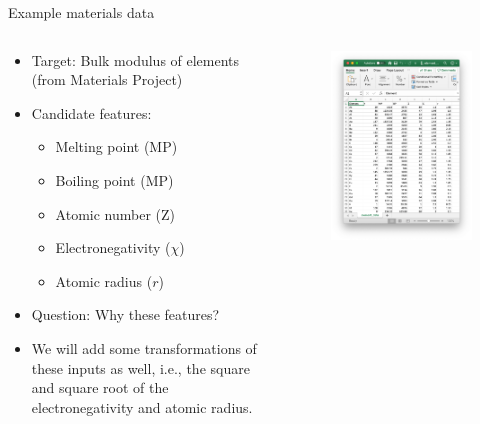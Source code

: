 \documentclass[aspectratio=169]{beamer}
\begin{document}
\begin{frame}{Example materials data}
    \begin{columns}
    \begin{column}{0.6\textwidth}
        \begin{itemize}
            \item Target: Bulk modulus of elements (from Materials Project)
            \item Candidate features:
            \begin{itemize}
                \item Melting point (MP)
                \item Boiling point (MP)
                \item Atomic number (Z)
                \item Electronegativity ($\chi$)
                \item Atomic radius ($r$)
            \end{itemize}
            \item Question: Why these features?
            \item We will add some transformations of these inputs as well, i.e., the square and square root of the electronegativity and atomic radius.
    \end{itemize}
    \end{column}
    \begin{column}{0.4\textwidth}
        \begin{figure}
        \centering
        \includegraphics[width=\textwidth]{figures/elementdata.png}

\end{figure}
\end{column}
\end{columns}
\end{frame}
\end{document}
